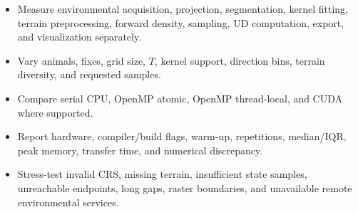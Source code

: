 \begin{itemize}
  \item Measure environmental acquisition, projection, segmentation, kernel fitting, terrain preprocessing, forward density, sampling, UD computation, export, and visualization separately.
  \item Vary animals, fixes, grid size, $T$, kernel support, direction bins, terrain diversity, and requested samples.
  \item Compare serial CPU, OpenMP atomic, OpenMP thread-local, and CUDA where supported.
  \item Report hardware, compiler/build flags, warm-up, repetitions, median/IQR, peak memory, transfer time, and numerical discrepancy.
  \item Stress-test invalid CRS, missing terrain, insufficient state samples, unreachable endpoints, long gaps, raster boundaries, and unavailable remote environmental services.
\end{itemize}
